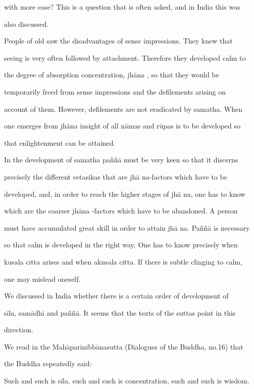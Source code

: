 with more ease? This is  a question that is often  asked,  and in India this was  

also discussed. 



People  of  old  saw  the  disadvantages  of  sense  impressions.  They  knew  that  

seeing is very often followed by attachment. Therefore they developed calm to  

the   degree   of   absorption   concentration,   jhāna ,   so   that   they   would   be  

temporarily   freed   from   sense   impressions   and   the   defilements   arising   on  

account of them. However, defilements are not eradicated by samatha. When  

one emerges from jhāna  insight of all nāmas and rūpas is to be developed so  

that enlightenment can be attained. 

   In the development of samatha paññā must be very keen so that it discerns  

precisely   the   different   cetasikas   that   are   jhā na-factors   which   have   to   be  

developed, and, in order to reach the higher stages of jhā na, one has to know  

which   are  the  coarser jhāna -factors which   have  to  be  abandoned. A   person  

must have accumulated great skill in order to attain jhā na. Paññā is necessary  

so that calm  is  developed in the right way.  One has to know precisely when  

kusala citta  arises  and when  akusala citta. If there is  subtle clinging to calm,  

one may mislead oneself. 

   We  discussed  in  India whether  there  is  a  certain  order  of  development  of  

sīla,  samādhi  and  paññā.  It  seems  that  the  texts  of  the  suttas  point  in  this  

direction. 



We read in the Mahāparinibbānasutta  (Dialogues of the Buddha, no.16) that  

the Buddha repeatedly said: 



      Such and such is sīla, such and such is concentration, such and such is wisdom. 

